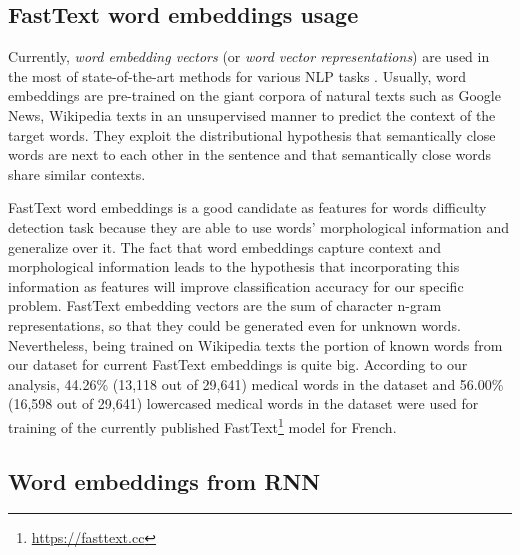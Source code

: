 \subsection{FastText word embeddings usage}
Currently, \textit{word embedding vectors} \citep{Mikolov-NIPS2013} (or \textit{word vector representations}) are used in the most of state-of-the-art methods for various NLP tasks \citep{NLPPROGRESS}. Usually, word embeddings are pre-trained on the giant corpora of natural texts such as Google News, Wikipedia texts in an unsupervised manner to predict the context of the target words. They exploit the distributional hypothesis that semantically close words are next to each other in the sentence and that semantically close words share similar contexts. 

FastText word embeddings \citep{Bojanowski-ARXIV2016} is a good candidate as features for words difficulty detection task because they are able to use words' morphological information and generalize over it. The fact that word embeddings capture context and morphological information leads to the hypothesis that incorporating this information as features will improve classification accuracy for our specific problem. FastText embedding vectors are the sum of character n-gram representations, so that they could be generated even for unknown words. Nevertheless, being trained on Wikipedia texts the portion of known words from our dataset for current FastText embeddings is quite big. According to our analysis, 44.26\% (13,118 out of 29,641) medical words in the dataset and 56.00\% (16,598 out of 29,641) lowercased medical words in the dataset were used for training of the currently published FastText\footnote{\url{https://fasttext.cc}} model for French.

\subsection{Word embeddings from RNN}





